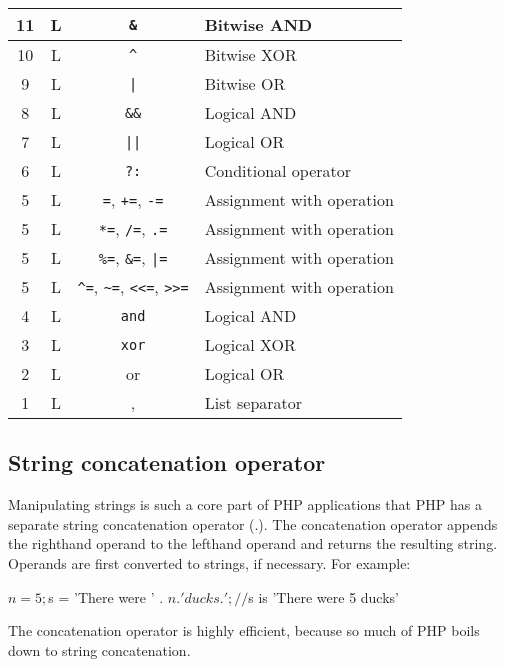 \documentclass{report}
\begin{document}
\begin{table}[h!]
\begin{tabular}{|c|c|c|l|}
        11 & L & \texttt{\&} & Bitwise AND \\ \hline
        10 & L & \texttt{\textasciicircum} & Bitwise XOR \\ \hline
        9 & L & \texttt{|} & Bitwise OR \\ \hline
        8 & L & \texttt{\&\&} & Logical AND \\ \hline
        7 & L & \texttt{||} & Logical OR \\ \hline
        6 & L & \texttt{?:} & Conditional operator \\ \hline
        5 & L & \texttt{=}, \texttt{+=}, \texttt{-=}& Assignment with operation \\ \hline
        5 & L & \texttt{*=}, \texttt{/=}, \texttt{.=}& Assignment with operation \\ \hline
        5 & L & \texttt{\%=}, \texttt{\&=}, \texttt{|=} & Assignment with operation \\ \hline
        5 & L & \texttt{\textasciicircum=}, \texttt{\textasciitilde=}, \texttt{\textless\textless=}, \texttt{\textgreater\textgreater=} & Assignment with operation \\ \hline
        4 & L & \texttt{and} & Logical AND \\ \hline
        3 & L & \texttt{xor} & Logical XOR \\ \hline
        2 &L &or &Logical OR \\ \hline
        1 &L &, &List separator \\ \hline
    \end{tabular}
\end{table}

\bigbreak \noindent 
\subsection{String concatenation operator}
\bigbreak \noindent 
Manipulating strings is such a core part of PHP applications that PHP has a separate
string concatenation operator (.). The concatenation operator appends the righthand operand to the lefthand operand and returns the resulting string. Operands are first
converted to strings, if necessary. For example:
\bigbreak \noindent 
\begin{phpcode}
$n = 5;
$s = 'There were ' . $n . ' ducks.';
// $s is 'There were 5 ducks'
\end{phpcode}
\bigbreak \noindent 
The concatenation operator is highly efficient, because so much of PHP boils down to string concatenation.
\bigbreak \noindent 
\end{document}

